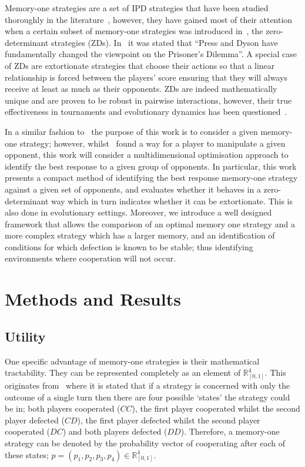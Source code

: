 \documentclass[10pt]{article}
\newcommand{\R}{\mathbb{R}}
\begin{document}
Memory-one strategies are a set of IPD strategies that have been
studied thoroughly in the literature~\cite{Nowak1990, Nowak1993}, however, they have gained
most of their attention when a certain subset of memory-one strategies was
introduced in~\cite{Press2012}, the zero-determinant strategies (ZDs). In~\cite{Stewart2012} it
was stated that ``Press and Dyson have fundamentally changed the viewpoint on
the Prisoner's Dilemma''.
A special case of ZDs are extortionate strategies that choose their actions so that a linear relationship is forced
between the players' score ensuring that they will always
receive at least as much as their opponents. ZDs are
indeed mathematically unique and are proven to be robust in pairwise
interactions, however, their true effectiveness in tournaments and
evolutionary dynamics has been questioned~\cite{adami2013, Hilbe2013b,
Hilbe2013, Hilbe2015, Knight2018, Harper2015}.

In a similar fashion to~\cite{Press2012} the purpose of this work is to consider
a given memory-one strategy; however, whilst~\cite{Press2012} found a way for a
player to manipulate a given opponent, this work will consider a
multidimensional optimisation approach to identify the best response to a given
group of opponents. In particular, this work presents a compact method of
identifying the best response memory-one strategy against a given set of
opponents, and evaluates whether it behaves in a
zero-determinant way which in turn indicates whether it can be extortionate. This is also done in evolutionary settings. Moreover, we
introduce a well designed framework that allows the comparison of an optimal
memory one strategy and a more complex strategy which has a larger memory, and an
identification of conditions for which defection is known to be stable; thus
identifying environments where cooperation will not occur.

\section{Methods and Results}
\subsection{Utility}

One specific advantage of memory-one strategies is their mathematical
tractability. They can be represented completely as an element of \(\R^{4}_{[0, 1]}\). This
originates from~\cite{Nowak1989} where it is stated that if a strategy is
concerned with only the outcome of a single turn then there are four possible
`states' the strategy could be in; both players cooperated (\(CC\)), 
the first player cooperated whilst the second player defected (\(CD\)),
the first player defected whilst the second player cooperated (\(DC\)) and
both players defected (\(DD\)).
Therefore, a memory-one strategy can be denoted by the probability vector of
cooperating after each of these states; \(p=(p_1, p_2, p_3, p_4) \in \R_{[0,1]}
^ 4\).
\end{document}
